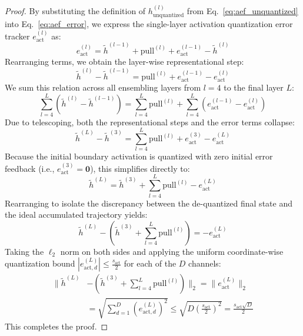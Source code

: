 \documentclass{article}
\theoremstyle{plain}
\theoremstyle{definition}
\theoremstyle{remark}
\begin{document}
\begin{proof}
By substituting the definition of $h^{(l)}_{\text{unquantized}}$ from Eq.~\ref{eq:aef_unquantized} into Eq.~\ref{eq:aef_error}, we express the single-layer activation quantization error tracker $e^{(l)}_{\text{act}}$ as:
\begin{equation}
    e^{(l)}_{\text{act}} = \tilde{h}^{(l-1)} + \text{pull}^{(l)} + e^{(l-1)}_{\text{act}} - \tilde{h}^{(l)}
\end{equation}
Rearranging terms, we obtain the layer-wise representational step:
\begin{equation}
    \tilde{h}^{(l)} - \tilde{h}^{(l-1)} = \text{pull}^{(l)} + e^{(l-1)}_{\text{act}} - e^{(l)}_{\text{act}}
\end{equation}
We sum this relation across all ensembling layers from $l=4$ to the final layer $L$:
\begin{equation}
    \sum_{l=4}^L \left( \tilde{h}^{(l)} - \tilde{h}^{(l-1)} \right) = \sum_{l=4}^L \text{pull}^{(l)} + \sum_{l=4}^L \left( e^{(l-1)}_{\text{act}} - e^{(l)}_{\text{act}} \right)
\end{equation}
Due to telescoping, both the representational steps and the error terms collapse:
\begin{equation}
    \tilde{h}^{(L)} - \tilde{h}^{(3)} = \sum_{l=4}^L \text{pull}^{(l)} + e^{(3)}_{\text{act}} - e^{(L)}_{\text{act}}
\end{equation}
Because the initial boundary activation is quantized with zero initial error feedback (i.e., $e^{(3)}_{\text{act}} = \mathbf{0}$), this simplifies directly to:
\begin{equation}
    \tilde{h}^{(L)} = \tilde{h}^{(3)} + \sum_{l=4}^L \text{pull}^{(l)} - e^{(L)}_{\text{act}}
\end{equation}
Rearranging to isolate the discrepancy between the de-quantized final state and the ideal accumulated trajectory yields:
\begin{equation}
    \tilde{h}^{(L)} - \left( \tilde{h}^{(3)} + \sum_{l=4}^L \text{pull}^{(l)} \right) = -e^{(L)}_{\text{act}}
\end{equation}
Taking the $\ell_2$ norm on both sides and applying the uniform coordinate-wise quantization bound $|e_{\text{act}, d}^{(L)}| \leq \frac{s_{\text{act}}}{2}$ for each of the $D$ channels:
\begin{equation}
\begin{split}
    \Bigg\| \tilde{h}^{(L)} & - \left( \tilde{h}^{(3)} + \sum_{l=4}^L \text{pull}^{(l)} \right) \Bigg\|_2 = \| e^{(L)}_{\text{act}} \|_2 \\
    & = \sqrt{ \sum_{d=1}^D \left( e_{\text{act}, d}^{(L)} \right)^2 } \leq \sqrt{ D \left( \frac{s_{\text{act}}}{2} \right)^2 } = \frac{s_{\text{act}} \sqrt{D}}{2}
\end{split}
\end{equation}
This completes the proof.
\end{proof}
\end{document}
